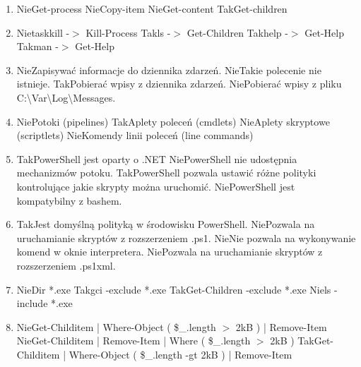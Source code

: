 \begin{enumerate}
		{Tak}{zatrzymuje wszystkie procesy których nazwa rozpoczyna się literą "d".}
		\item {}%
		{Nie}{Get-process}%
		{Nie}{Copy-item}%
		{Nie}{Get-content}%
		{Tak}{Get-children}
		\item {}%
		{Nie}{taskkill -$>$ Kill-Process}%
		{Tak}{ls -$>$ Get-Children}%
		{Tak}{help -$>$ Get-Help}%
		{Tak}{man -$>$ Get-Help}
		\item {}%
		{Nie}{Zapisywać informacje do dziennika zdarzeń.}%
		{Nie}{Takie polecenie nie istnieje.}%
		{Tak}{Pobierać wpisy z dziennika zdarzeń.}%
		{Nie}{Pobierać wpisy z pliku C:\textbackslash Var\textbackslash Log\textbackslash Messages.}
		\item {}%
		{Nie}{Potoki (pipelines)}%
		{Tak}{Aplety poleceń (cmdlets)}%
		{Nie}{Aplety skryptowe (scriptlets)}%
		{Nie}{Komendy linii poleceń (line commands)}
		\item {}%
		{Tak}{PowerShell jest oparty o .NET}%
		{Nie}{PowerShell nie udostępnia mechanizmów potoku.}%
		{Tak}{PowerShell pozwala ustawić różne polityki kontrolujące jakie skrypty można uruchomić.}%
		{Nie}{PowerShell jest kompatybilny z bashem.}
		\newpage
		\item {}%
		{Tak}{Jest domyślną polityką w środowisku PowerShell.}%
		{Nie}{Pozwala na uruchamianie skryptów z rozszerzeniem .ps1.}%
		{Nie}{Nie pozwala na wykonywanie komend w oknie interpretera.}%
		{Nie}{Pozwala na uruchamianie skryptów z rozszerzeniem .ps1xml.}
		\item {}%
		{Nie}{Dir *.exe}%
		{Tak}{gci -exclude *.exe}%
		{Tak}{Get-Children -exclude *.exe}%
		{Nie}{ls -include *.exe}
		\item {}%
		{Nie}{Get-Childitem | Where-Object ( \$\_.length $>$ 2kB ) | Remove-Item}%
		{Nie}{Get-Childitem | Remove-Item | Where ( \$\_.length $>$ 2kB )}%
		{Tak}{Get-Childitem | Where-Object ( \$\_.length -gt 2kB ) | Remove-Item}%

\end{enumerate}
